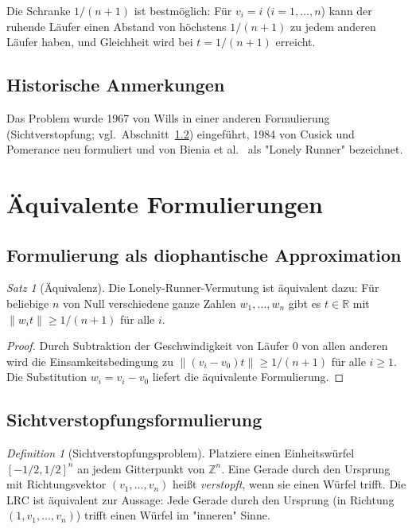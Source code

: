 \documentclass[12pt,a4paper]{amsart}
\theoremstyle{definition}
\theoremstyle{remark}
\newtheorem{satz}[theorem]{Satz}
\newtheorem{definition_de}[theorem]{Definition}
\newcommand{\Z}{\mathbb{Z}}
\newcommand{\R}{\mathbb{R}}
\begin{document}
Die Schranke $1/(n+1)$ ist bestmöglich: Für $v_i = i$ ($i = 1, \ldots, n$) kann
der ruhende Läufer einen Abstand von höchstens $1/(n+1)$ zu jedem anderen Läufer
haben, und Gleichheit wird bei $t = 1/(n+1)$ erreicht.

\subsection{Historische Anmerkungen}

Das Problem wurde 1967 von Wills \cite{Wills1967} in einer anderen Formulierung
(Sichtverstopfung; vgl.\ Abschnitt~\ref{sec:sicht}) eingeführt, 1984 von Cusick
und Pomerance \cite{CusickPomerance1984} neu formuliert und von Bienia et al.\
\cite{BieniaEtal1998} als "Lonely Runner" bezeichnet.

\section{Äquivalente Formulierungen}\label{sec:aequiv}

\subsection{Formulierung als diophantische Approximation}

\begin{satz}[Äquivalenz]\label{satz:dioph}
Die Lonely-Runner-Vermutung ist äquivalent dazu: Für beliebige $n$ von Null
verschiedene ganze Zahlen $w_1, \ldots, w_n$ gibt es $t \in \R$ mit
$\|w_i t\| \geq 1/(n+1)$ für alle $i$.
\end{satz}

\begin{proof}
Durch Subtraktion der Geschwindigkeit von Läufer 0 von allen anderen wird die
Einsamkeitsbedingung zu $\|(v_i - v_0)t\| \geq 1/(n+1)$ für alle $i \geq 1$.
Die Substitution $w_i = v_i - v_0$ liefert die äquivalente Formulierung.
\end{proof}

\subsection{Sichtverstopfungsformulierung}\label{sec:sicht}

\begin{definition_de}[Sichtverstopfungsproblem]
Platziere einen Einheitswürfel $[-1/2, 1/2]^n$ an jedem Gitterpunkt von $\Z^n$.
Eine Gerade durch den Ursprung mit Richtungsvektor $(v_1, \ldots, v_n)$ heißt
\emph{verstopft}, wenn sie einen Würfel trifft. Die LRC ist äquivalent zur Aussage:
Jede Gerade durch den Ursprung (in Richtung $(1, v_1, \ldots, v_n)$) trifft einen
Würfel im "inneren" Sinne.
\end{definition_de}
\end{document}
